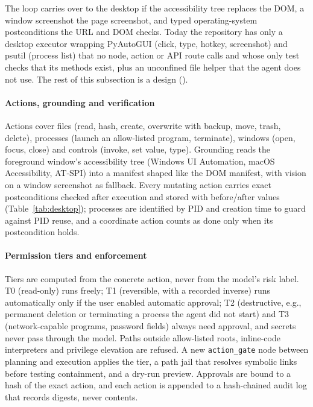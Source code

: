 The loop carries over to the desktop if the accessibility tree replaces the DOM, a window screenshot the page screenshot, and typed operating-system postconditions the URL and DOM checks. Today the repository has only a desktop executor wrapping PyAutoGUI (click, type, hotkey, screenshot) and psutil (process list) that no node, action or API route calls and whose only test checks that its methods exist, plus an unconfined file helper that the agent does not use. The rest of this subsection is a design ().

\paragraph{Actions, grounding and verification} Actions cover files (read, hash, create, overwrite with backup, move, trash, delete), processes (launch an allow-listed program, terminate), windows (open, focus, close) and controls (invoke, set value, type). Grounding reads the foreground window's accessibility tree (Windows UI Automation, macOS Accessibility, AT-SPI) into a manifest shaped like the DOM manifest, with vision on a window screenshot as fallback. Every mutating action carries exact postconditions checked after execution and stored with before/after values (Table~\ref{tab:desktop}); processes are identified by PID and creation time to guard against PID reuse, and a coordinate action counts as done only when its postcondition holds.

\paragraph{Permission tiers and enforcement} Tiers are computed from the concrete action, never from the model's risk label. T0 (read-only) runs freely; T1 (reversible, with a recorded inverse) runs automatically only if the user enabled automatic approval; T2 (destructive, e.g., permanent deletion or terminating a process the agent did not start) and T3 (network-capable programs, password fields) always need approval, and secrets never pass through the model. Paths outside allow-listed roots, inline-code interpreters and privilege elevation are refused. A new \texttt{action\_gate} node between planning and execution applies the tier, a path jail that resolves symbolic links before testing containment, and a dry-run preview. Approvals are bound to a hash of the exact action, and each action is appended to a hash-chained audit log that records digests, never contents.


